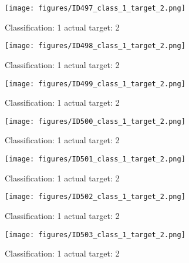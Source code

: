 \begin{figure}[h!]
\begin{center}
\texttt{[image: figures/ID497\_class\_1\_target\_2.png]}
\end{center}
\caption{ Classification: 1 actual target: 2}
\label{fig:ID497_class_1_target_2}
\end{figure}
\begin{figure}[h!]
\begin{center}
\texttt{[image: figures/ID498\_class\_1\_target\_2.png]}
\end{center}
\caption{ Classification: 1 actual target: 2}
\label{fig:ID498_class_1_target_2}
\end{figure}
\begin{figure}[h!]
\begin{center}
\texttt{[image: figures/ID499\_class\_1\_target\_2.png]}
\end{center}
\caption{ Classification: 1 actual target: 2}
\label{fig:ID499_class_1_target_2}
\end{figure}
\begin{figure}[h!]
\begin{center}
\texttt{[image: figures/ID500\_class\_1\_target\_2.png]}
\end{center}
\caption{ Classification: 1 actual target: 2}
\label{fig:ID500_class_1_target_2}
\end{figure}
\begin{figure}[h!]
\begin{center}
\texttt{[image: figures/ID501\_class\_1\_target\_2.png]}
\end{center}
\caption{ Classification: 1 actual target: 2}
\label{fig:ID501_class_1_target_2}
\end{figure}
\begin{figure}[h!]
\begin{center}
\texttt{[image: figures/ID502\_class\_1\_target\_2.png]}
\end{center}
\caption{ Classification: 1 actual target: 2}
\label{fig:ID502_class_1_target_2}
\end{figure}
\begin{figure}[h!]
\begin{center}
\texttt{[image: figures/ID503\_class\_1\_target\_2.png]}
\end{center}
\caption{ Classification: 1 actual target: 2}
\label{fig:ID503_class_1_target_2}
\end{figure}
